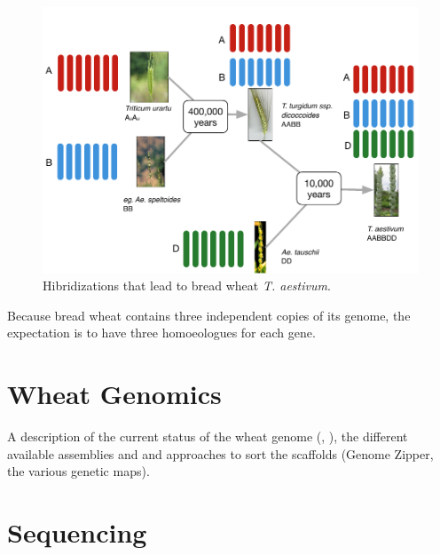 \begin{figure}
  \includegraphics[width=1\textwidth]{LitReview/Figures/WheatPolyplodization.pdf}
  \caption{Hibridizations that lead to bread wheat \textit{T. aestivum}.  }
  \label{fig:lit:polyplody}
\end{figure}
Because bread wheat contains three independent copies of its genome, the expectation is to have three homoeologues for each gene. 



\section{Wheat Genomics}

A description of the current status of the wheat genome (\citet{Mayer2014}, \citet{Chapman2015}), the different available assemblies and and approaches to sort the scaffolds (Genome Zipper, the various genetic maps).  
\section{Sequencing} 




